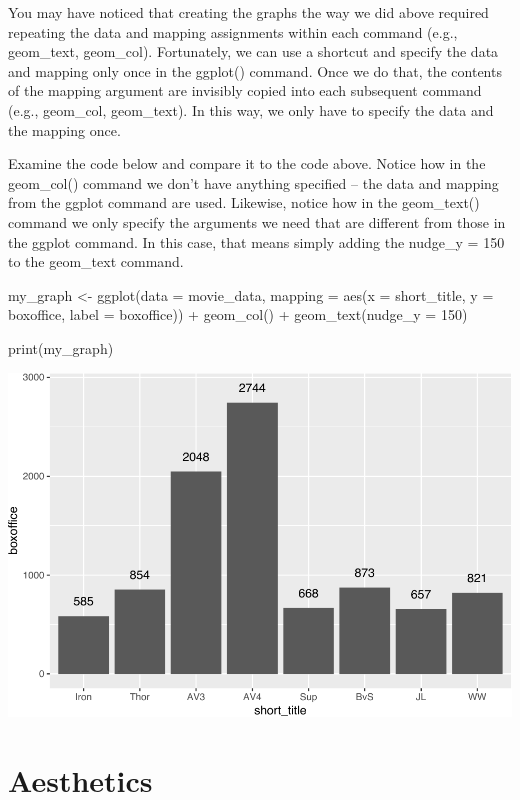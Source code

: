\documentclass[
]{krantz}
\makeatletter
\newenvironment{Shaded}{\begin{snugshade}}{\end{snugshade}}
\newcommand{\AttributeTok}[1]{\textcolor[rgb]{0.61,0.61,0.61}{#1}}
\newcommand{\DecValTok}[1]{\textcolor[rgb]{0.06,0.06,0.06}{#1}}
\newcommand{\FunctionTok}[1]{\textcolor[rgb]{0,0,0}{#1}}
\newcommand{\NormalTok}[1]{#1}
\newcommand{\OtherTok}[1]{\textcolor[rgb]{0.37,0.37,0.37}{#1}}
\newcommand{\SpecialCharTok}[1]{\textcolor[rgb]{0,0,0}{#1}}
\newenvironment{kframe}{%
\medskip{}
\setlength{\fboxsep}{.8em}
 \def\at@end@of@kframe{}%
 \ifinner\ifhmode%
  \def\at@end@of@kframe{\end{minipage}}%
  \begin{minipage}{\columnwidth}%
 \fi\fi%
 \def\FrameCommand##1{\hskip\@totalleftmargin \hskip-\fboxsep
 \colorbox{shadecolor}{##1}\hskip-\fboxsep
     \hskip-\linewidth \hskip-\@totalleftmargin \hskip\columnwidth}%
 \MakeFramed {\advance\hsize-\width
   \@totalleftmargin\z@ \linewidth\hsize
   \@setminipage}}%
 {\par\unskip\endMakeFramed%
 \at@end@of@kframe}
\renewenvironment{Shaded}{\begin{kframe}}{\end{kframe}}
\makeatother
\begin{document}
You may have noticed that creating the graphs the way we did above required repeating the data and mapping assignments within each command (e.g., geom\_text, geom\_col). Fortunately, we can use a shortcut and specify the data and mapping only once in the ggplot() command. Once we do that, the contents of the mapping argument are invisibly copied into each subsequent command (e.g., geom\_col, geom\_text). In this way, we only have to specify the data and the mapping once.

Examine the code below and compare it to the code above. Notice how in the geom\_col() command we don't have anything specified -- the data and mapping from the ggplot command are used. Likewise, notice how in the geom\_text() command we only specify the arguments we need that are different from those in the ggplot command. In this case, that means simply adding the nudge\_y = 150 to the geom\_text command.

\begin{Shaded}
\begin{Highlighting}[]
\NormalTok{my\_graph }\OtherTok{\textless{}{-}} \FunctionTok{ggplot}\NormalTok{(}\AttributeTok{data =}\NormalTok{ movie\_data,}
           \AttributeTok{mapping =} \FunctionTok{aes}\NormalTok{(}\AttributeTok{x =}\NormalTok{ short\_title,}
                         \AttributeTok{y =}\NormalTok{ boxoffice,}
                         \AttributeTok{label =}\NormalTok{ boxoffice)) }\SpecialCharTok{+}
  \FunctionTok{geom\_col}\NormalTok{() }\SpecialCharTok{+}
  \FunctionTok{geom\_text}\NormalTok{(}\AttributeTok{nudge\_y =} \DecValTok{150}\NormalTok{) }

\FunctionTok{print}\NormalTok{(my\_graph)}
\end{Highlighting}
\end{Shaded}

\includegraphics[width=0.65\linewidth]{bookdown_files/figure-latex/unnamed-chunk-201-1}

\hypertarget{aesthetics}{%
\section{Aesthetics}\label{aesthetics}}
\end{document}
